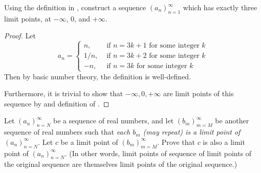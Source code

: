 \begin{exercise} \label{exercise 6.4.9}
Using the definition in , construct a sequence \((a_n)_{n = 1}^{\infty}\) which has exactly three limit points, at \(-\infty\), \(0\), and \(+\infty\).
\end{exercise}

\begin{proof}
Let
\begin{equation}
    a_n =
    \begin{cases}
      n, & \text{ if } n = 3k + 1 \text{ for some integer } k \\
      1/n, & \text{ if } n = 3k + 2 \text{ for some integer } k \\
      -n, & \text{ if } n = 3k \text{ for some integer } k
    \end{cases}
\end{equation}
Then by basic number theory, the definition is well-defined.

Furthermore, it is trivial to show that \(-\infty, 0, +\infty\) are limit points of this sequence by  and definition of .
\end{proof}

\begin{exercise}
\label{exercise 6.4.10}
Let \((a_n)_{n = N}^{\infty}\) be a sequence of real numbers, and let \((b_m)_{m = M}^{\infty}\) be another sequence of real numbers such that \emph{each \(b_m\) (may repeat) is a limit point of} \((a_n)_{n = N}^{\infty}\).
Let \(c\) be a limit point of \((b_m)_{m = M}^{\infty}\).
Prove that \(c\) is also a limit point of \((a_n)_{n = N}^{\infty}\).
(In other words, limit points of sequence of limit points of the original sequence are themselves limit points of the original sequence.)
\end{exercise}

